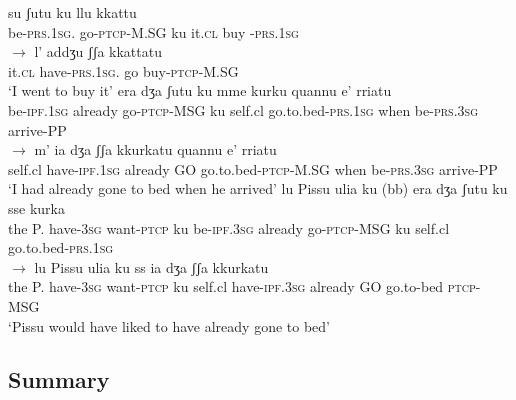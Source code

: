 \documentclass[output=paper]{langscibook}
\begin{document}
\ea\label{ac47}
    \ea \label{ac47a}
        \ea \label{ac47ai}\gll su        ʃutu        ku  llu   kkattu\\
       be-\textsc{prs}.\textsc{1sg}.    go-\textsc{ptcp}-M.SG  ku   it.\textsc{cl} buy -\textsc{prs}.\textsc{1sg}\\
        \ex \label{ac47aii}$\rightarrow$ \gll l’   addʒu       ʃʃa   kkattatu\\
       it.\textsc{cl} have-\textsc{prs}.\textsc{1sg}.    go  buy-\textsc{ptcp}-M.SG\\
      \glt ‘I went to buy it’
        \z
    \ex\label{ac47b}
        \ea \label{ac47bi}\gll era      dʒa    ʃutu      ku mme   kurku     quannu  e’       rriatu \\
       be-\textsc{ipf}.\textsc{1sg} already go-\textsc{ptcp}-MSG ku self.cl go.to.bed-\textsc{prs}.\textsc{1sg}
       when    be-\textsc{prs}.\textsc{3sg}  arrive-PP\\
        \ex    \label{ac47bii}$\rightarrow$  \gll m’   ia        dʒa   ʃʃa  kkurkatu        quannu  e’        rriatu\\
       self.cl  have-\textsc{ipf}.\textsc{1sg} already GO  go.to.bed-\textsc{ptcp}-M.SG
       when    be-\textsc{prs}.\textsc{3sg}  arrive-PP\\
       \glt ‘I had already gone to bed when he arrived’
        \z
    \ex\label{ac47c}
        \ea \label{ac47ci}\gll lu Pissu ulia   ku    (bb) era    dʒa   ʃutu         ku sse    kurka\\
       the P.  have-\textsc{3sg} want-\textsc{ptcp} ku be-\textsc{ipf}.\textsc{3sg} already go-\textsc{ptcp}-MSG    ku self.cl   go.to.bed-\textsc{prs}.\textsc{1sg}\\
        \ex  \label{ac47cii}  $\rightarrow$ \gll lu Pissu ulia   ku       ss   ia      dʒa         ʃʃa  kkurkatu\\
      the P.  have-\textsc{3sg} want-\textsc{ptcp} ku self.cl  have-\textsc{ipf}.\textsc{3sg} already
       GO go.to-bed \textsc{ptcp}-MSG\\
      \glt ‘Pissu would have liked to have already gone to bed’
        \z
    \z
\z

\subsection{Summary}
\end{document}
